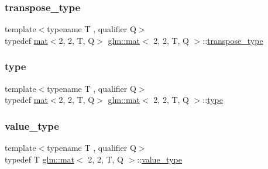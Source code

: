 \mbox{\label{structglm_1_1mat_3_012_00_012_00_01_t_00_01_q_01_4_a9635a76e3f23ca6da671e913dfd23bfd}} 
\subsubsection{\texorpdfstring{transpose\+\_\+type}{transpose\_type}}
{\footnotesize\ttfamily template$<$typename T , qualifier Q$>$ \\
typedef \hyperlink{structglm_1_1mat}{mat}$<$2, 2, T, Q$>$ \hyperlink{structglm_1_1mat}{glm\+::mat}$<$ 2, 2, T, Q $>$\+::\hyperlink{structglm_1_1mat_3_012_00_012_00_01_t_00_01_q_01_4_a9635a76e3f23ca6da671e913dfd23bfd}{transpose\+\_\+type}}

\mbox{\label{structglm_1_1mat_3_012_00_012_00_01_t_00_01_q_01_4_ac6dc94bb53f4e93c806d3b38cbf9172c}} 
\subsubsection{\texorpdfstring{type}{type}}
{\footnotesize\ttfamily template$<$typename T , qualifier Q$>$ \\
typedef \hyperlink{structglm_1_1mat}{mat}$<$2, 2, T, Q$>$ \hyperlink{structglm_1_1mat}{glm\+::mat}$<$ 2, 2, T, Q $>$\+::\hyperlink{structglm_1_1mat_3_012_00_012_00_01_t_00_01_q_01_4_ac6dc94bb53f4e93c806d3b38cbf9172c}{type}}

\mbox{\label{structglm_1_1mat_3_012_00_012_00_01_t_00_01_q_01_4_a6bd6b4c0d4bf7dff724cc03096b92d40}} 
\subsubsection{\texorpdfstring{value\+\_\+type}{value\_type}}
{\footnotesize\ttfamily template$<$typename T , qualifier Q$>$ \\
typedef T \hyperlink{structglm_1_1mat}{glm\+::mat}$<$ 2, 2, T, Q $>$\+::\hyperlink{structglm_1_1mat_3_012_00_012_00_01_t_00_01_q_01_4_a6bd6b4c0d4bf7dff724cc03096b92d40}{value\+\_\+type}}



